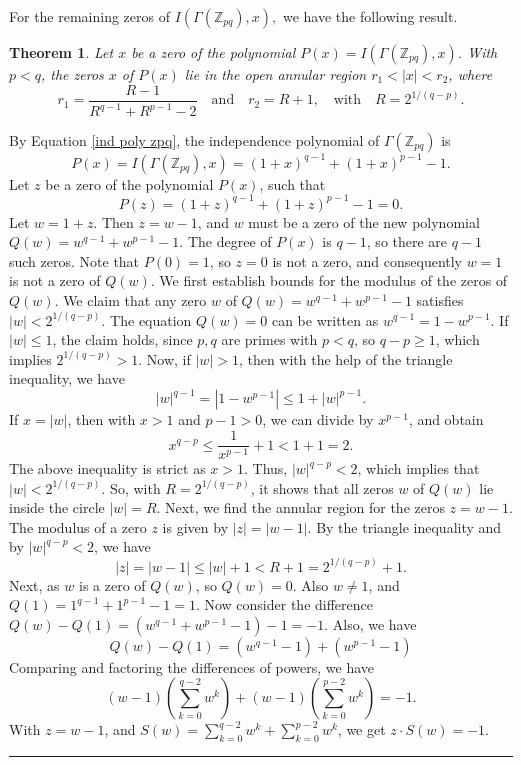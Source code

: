 \documentclass[12pt,twoside]{article}
\newtheorem{theorem}{Theorem}[section]
\renewenvironment{proof}{{\noindent\bfseries Proof.}}{\qed}
\def\qed{\nolinebreak\hfill\rule{.2cm}{.2cm}\par\addvspace{.5cm}}
\begin{document}
For the remaining zeros of $I(\varGamma(\mathbb{Z}_{pq}), x),$ we have the following result.
\begin{theorem}\label{zeros pq complex}
	Let $x$ be a zero of the polynomial $P(x)=I(\varGamma(\mathbb{Z}_{pq}), x)$. With $p < q$, the zeros $x$ of $P(x)$ lie in the open annular region $r_1 < |x| < r_2$, where
	$$r_1 = \frac{R-1}{R^{q-1} + R^{p-1} - 2} \quad \text{and} \quad r_2 = R+1,\quad \text{with}\quad R = 2^{1/(q-p)}.$$
\end{theorem}
\begin{proof}
	By Equation \eqref{ind poly zpq}, the independence polynomial of $ \varGamma(\mathbb{Z}_{pq})$ is 
	$$P(x)=I(\varGamma(\mathbb{Z}_{pq}), x) = (1+x)^{q-1} + (1+x)^{p-1} - 1.$$
	Let $z$ be a zero of the polynomial $P(x)$, such that
	$$P(z) = (1+z)^{q-1} + (1+z)^{p-1} - 1 = 0.$$
	Let $w = 1+z$. Then $z=w-1$, and $w$ must be a zero of the new polynomial $Q(w) = w^{q-1} + w^{p-1} - 1$. The degree of $P(x)$ is $q-1$, so there are $q-1$ such zeros. Note that $P(0)=1$, so $z=0$ is not a zero, and consequently $w=1$ is not a zero of $Q(w)$. We first establish bounds for the modulus of the zeros of $Q(w)$. We claim that  any zero $w$ of $Q(w)=w^{q-1} + w^{p-1} - 1$ satisfies $|w| < 2^{1/(q-p)}$. 	The equation $Q(w)=0$ can be written as $w^{q-1} = 1 - w^{p-1}$. If $|w| \le 1$, the claim holds, since $p, q$ are primes with $p<q$, so $q-p \ge 1$, which implies $2^{1/(q-p)} > 1$. Now, if $|w|>1$, then with the help of the triangle inequality, we have
	$$|w|^{q-1} = |1 - w^{p-1}| \le 1 + |w|^{p-1}.$$
	If $x = |w|$, then with $x>1$ and $p-1>0$, we can divide by $x^{p-1}$, and obtain
	$$x^{q-p} \le \frac{1}{x^{p-1}} + 1 < 1+1 = 2.$$
	The above inequality is strict as $x>1$. Thus, $|w|^{q-p} < 2$, which implies that $|w| < 2^{1/(q-p)}$. So, with $R = 2^{1/(q-p)}$, it shows that all zeros $w$ of $Q(w)$ lie inside the circle $|w|=R$. Next, we find the annular region for the zeros $z=w-1$. The modulus of a zero $z$ is given by $|z|=|w-1|$. By the triangle inequality and by $|w|^{q-p} < 2$, we have
	$$|z| = |w-1| \le |w|+1 < R+1 = 2^{1/(q-p)}+1.$$
	Next, as $w$ is a zero of $Q(w)$, so $Q(w)=0$. Also $w \ne 1$, and $Q(1) = 1^{q-1}+1^{p-1}-1 = 1$. Now consider the difference $Q(w)-Q(1)=(w^{q-1}+w^{p-1}-1) - 1 = -1.$
	Also, we have
	$$Q(w)-Q(1) = (w^{q-1}-1) + (w^{p-1}-1)$$
	Comparing and factoring the differences of powers, we have
	$$(w-1)\left(\sum_{k=0}^{q-2} w^k\right) + (w-1)\left(\sum_{k=0}^{p-2} w^k\right) = -1.$$
	With $z=w-1$, and $S(w) = \sum_{k=0}^{q-2} w^k + \sum_{k=0}^{p-2} w^k$, we get $z \cdot S(w) = -1$.

\end{proof}
\end{document}
